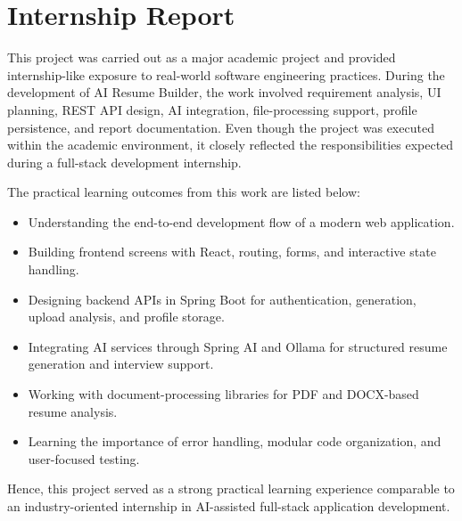 \section*{Internship Report}
\noindent This project was carried out as a major academic project and provided internship-like exposure to real-world software engineering practices. During the development of AI Resume Builder, the work involved requirement analysis, UI planning, REST API design, AI integration, file-processing support, profile persistence, and report documentation. Even though the project was executed within the academic environment, it closely reflected the responsibilities expected during a full-stack development internship.

\noindent The practical learning outcomes from this work are listed below:
\begin{itemize}
\item Understanding the end-to-end development flow of a modern web application.
\item Building frontend screens with React, routing, forms, and interactive state handling.
\item Designing backend APIs in Spring Boot for authentication, generation, upload analysis, and profile storage.
\item Integrating AI services through Spring AI and Ollama for structured resume generation and interview support.
\item Working with document-processing libraries for PDF and DOCX-based resume analysis.
\item Learning the importance of error handling, modular code organization, and user-focused testing.
\end{itemize}

\noindent Hence, this project served as a strong practical learning experience comparable to an industry-oriented internship in AI-assisted full-stack application development.
